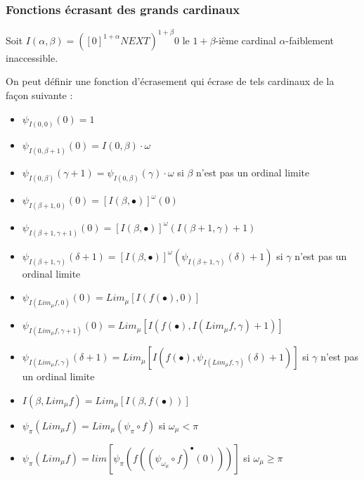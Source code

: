 \documentclass[12pt]{beamer}
\begin{document}
\begin{frame}
\frametitle{Fonctions écrasant des grands cardinaux}

Soit \( I(\alpha,\beta) = ([0]^{1+\alpha} NEXT)^{1+\beta} 0 \) le \( 1+\beta \)-ième cardinal $\alpha$-faiblement inaccessible.

On peut définir une fonction d'écrasement qui écrase de tels cardinaux de la façon suivante :

\scriptsize

\begin{itemize}
     \setlength{\itemsep}{1pt}
     \setlength{\parskip}{0pt}
     \setlength{\parsep}{0pt}

\item \( \psi_{I(0,0)}(0) = 1 \)

\item \( \psi_{I(0,\beta+1)}(0) = I(0,\beta) \cdot \omega \)

\item \( \psi_{I(0,\beta)}(\gamma+1) = \psi_{I(0,\beta)}(\gamma) \cdot \omega \) si \( \beta \) n'est pas un ordinal limite

\item \( \psi_{I(\beta+1,0)}(0) = [I(\beta,\bullet)]^\omega (0) \)

\item \( \psi_{I(\beta+1,\gamma+1)}(0) = [I(\beta,\bullet)]^\omega (I(\beta+1,\gamma)+1) \)

\item \( \psi_{I(\beta+1,\gamma)}(\delta+1) = [I(\beta,\bullet)]^\omega (\psi_{I(\beta+1,\gamma)}(\delta)+1) \) si \( \gamma \) n'est pas un ordinal limite

\item \( \psi_{I(Lim_\mu f,0)}(0) = Lim_\mu [I(f(\bullet),0)] \)

\item \( \psi_{I(Lim_\mu f,\gamma+1)}(0) = Lim_\mu [I(f(\bullet),I(Lim_\mu f,\gamma)+1)] \)

\item \( \psi_{I(Lim_\mu f,\gamma)}(\delta+1) = Lim_\mu [I(f(\bullet),\psi_{I(Lim_\mu f,\gamma)}(\delta)+1)] \) si \( \gamma \) n'est pas un ordinal limite 

\item \( I(\beta,Lim_\mu f) = Lim_\mu [I(\beta,f(\bullet))] \)

\item \( \psi_\pi(Lim_\mu f) = Lim_\mu (\psi_\pi \circ f) \) si \( \omega_\mu < \pi \)

\item \( \psi_\pi(Lim_\mu f) = lim [\psi_\pi (f ((\psi_{\omega_\mu} \circ f)^\bullet (0)))] \) si \( \omega_\mu \ge \pi \)

\end{itemize}

\end{frame}
\end{document}
